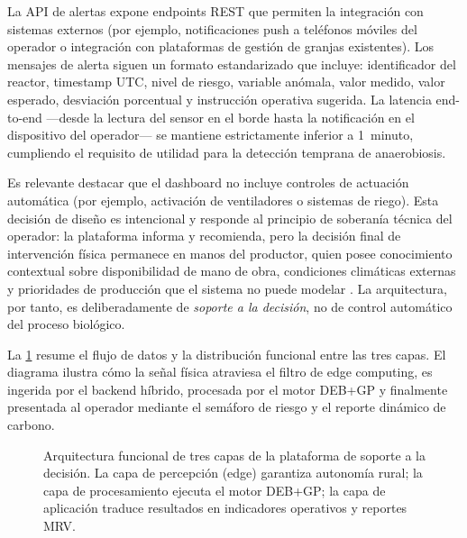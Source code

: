 La API de alertas expone endpoints REST que permiten la integración con sistemas externos (por ejemplo, notificaciones push a teléfonos móviles del operador o integración con plataformas de gestión de granjas existentes). Los mensajes de alerta siguen un formato estandarizado que incluye: identificador del reactor, timestamp UTC, nivel de riesgo, variable anómala, valor medido, valor esperado, desviación porcentual y instrucción operativa sugerida. La latencia end-to-end —desde la lectura del sensor en el borde hasta la notificación en el dispositivo del operador— se mantiene estrictamente inferior a \num{1}~minuto, cumpliendo el requisito de utilidad para la detección temprana de anaerobiosis.

Es relevante destacar que el dashboard no incluye controles de actuación automática (por ejemplo, activación de ventiladores o sistemas de riego). Esta decisión de diseño es intencional y responde al principio de soberanía técnica del operador: la plataforma informa y recomienda, pero la decisión final de intervención física permanece en manos del productor, quien posee conocimiento contextual sobre disponibilidad de mano de obra, condiciones climáticas externas y prioridades de producción que el sistema no puede modelar \parencite{fawzyStrategiesMitigationClimate2020}. La arquitectura, por tanto, es deliberadamente de \textit{soporte a la decisión}, no de control automático del proceso biológico.

La \cref{fig:arquitectura_tres_capas} resume el flujo de datos y la distribución funcional entre las tres capas. El diagrama ilustra cómo la señal física atraviesa el filtro de edge computing, es ingerida por el backend híbrido, procesada por el motor DEB+GP y finalmente presentada al operador mediante el semáforo de riesgo y el reporte dinámico de carbono.

\begin{figure}[htbp]
    \centering
    \caption{Arquitectura funcional de tres capas de la plataforma de soporte a la decisión. La capa de percepción (edge) garantiza autonomía rural; la capa de procesamiento ejecuta el motor DEB+GP; la capa de aplicación traduce resultados en indicadores operativos y reportes MRV.}
    \label{fig:arquitectura_tres_capas}
\end{figure}

